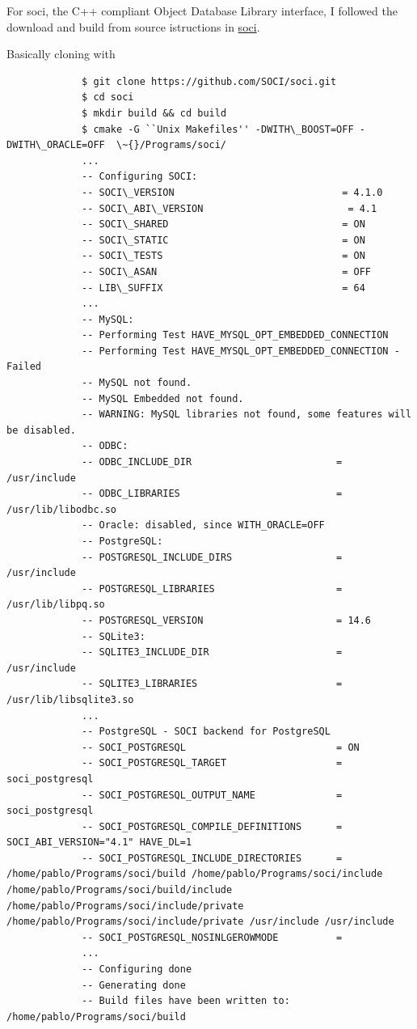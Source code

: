 \documentclass[]{scrartcl}
\begin{document}
	For soci, the C++ compliant Object Database Library interface, I followed the download and build from source istructions in \href{https://soci.sourceforge.net/doc/master/installation/}{soci}.
	
	Basically cloning with 
	
	\begin{tiny}
		\begin{verbatim}
			 $ git clone https://github.com/SOCI/soci.git
			 $ cd soci
			 $ mkdir build && cd build
			 $ cmake -G ``Unix Makefiles'' -DWITH\_BOOST=OFF -DWITH\_ORACLE=OFF  \~{}/Programs/soci/
			 ...
			 -- Configuring SOCI: 
			 -- SOCI\_VERSION                             = 4.1.0 
			 -- SOCI\_ABI\_VERSION                         = 4.1 
			 -- SOCI\_SHARED                              = ON 
			 -- SOCI\_STATIC                              = ON 
			 -- SOCI\_TESTS                               = ON 
			 -- SOCI\_ASAN                                = OFF 
			 -- LIB\_SUFFIX                               = 64 
			 ...
			 -- MySQL: 
			 -- Performing Test HAVE_MYSQL_OPT_EMBEDDED_CONNECTION
			 -- Performing Test HAVE_MYSQL_OPT_EMBEDDED_CONNECTION - Failed
			 -- MySQL not found.
			 -- MySQL Embedded not found.
			 -- WARNING: MySQL libraries not found, some features will be disabled. 
			 -- ODBC: 
			 -- ODBC_INCLUDE_DIR                         = /usr/include 
			 -- ODBC_LIBRARIES                           = /usr/lib/libodbc.so 
			 -- Oracle: disabled, since WITH_ORACLE=OFF 
			 -- PostgreSQL: 
			 -- POSTGRESQL_INCLUDE_DIRS                  = /usr/include 
			 -- POSTGRESQL_LIBRARIES                     = /usr/lib/libpq.so 
			 -- POSTGRESQL_VERSION                       = 14.6 
			 -- SQLite3: 
			 -- SQLITE3_INCLUDE_DIR                      = /usr/include 
			 -- SQLITE3_LIBRARIES                        = /usr/lib/libsqlite3.so 
			 ...
			 -- PostgreSQL - SOCI backend for PostgreSQL 
			 -- SOCI_POSTGRESQL                          = ON 
			 -- SOCI_POSTGRESQL_TARGET                   = soci_postgresql 
			 -- SOCI_POSTGRESQL_OUTPUT_NAME              = soci_postgresql 
			 -- SOCI_POSTGRESQL_COMPILE_DEFINITIONS      = SOCI_ABI_VERSION="4.1" HAVE_DL=1 
			 -- SOCI_POSTGRESQL_INCLUDE_DIRECTORIES      = /home/pablo/Programs/soci/build /home/pablo/Programs/soci/include /home/pablo/Programs/soci/build/include /home/pablo/Programs/soci/include/private /home/pablo/Programs/soci/include/private /usr/include /usr/include 
			 -- SOCI_POSTGRESQL_NOSINLGEROWMODE          =  
			 ...
			 -- Configuring done
			 -- Generating done
			 -- Build files have been written to: /home/pablo/Programs/soci/build

\end{verbatim}
\end{tiny}
\end{document}
